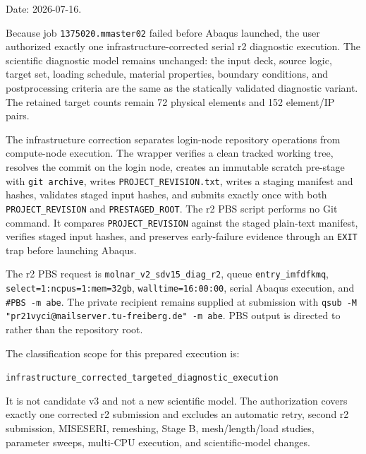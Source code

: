 \documentclass[11pt,a4paper]{article}
\begin{document}
Date: 2026-07-16.

Because job \texttt{1375020.mmaster02} failed before Abaqus launched, the user authorized exactly one infrastructure-corrected serial r2 diagnostic execution. The scientific diagnostic model remains unchanged: the input deck, source logic, target set, loading schedule, material properties, boundary conditions, and postprocessing criteria are the same as the statically validated diagnostic variant. The retained target counts remain 72 physical elements and 152 element/IP pairs.

The infrastructure correction separates login-node repository operations from compute-node execution. The wrapper  verifies a clean tracked working tree, resolves the commit on the login node, creates an immutable scratch pre-stage with \texttt{git archive}, writes \texttt{PROJECT\_REVISION.txt}, writes a staging manifest and hashes, validates staged input hashes, and submits exactly once with both \texttt{PROJECT\_REVISION} and \texttt{PRESTAGED\_ROOT}. The r2 PBS script  performs no Git command. It compares \texttt{PROJECT\_REVISION} against the staged plain-text manifest, verifies staged input hashes, and preserves early-failure evidence through an \texttt{EXIT} trap before launching Abaqus.

The r2 PBS request is \texttt{molnar\_v2\_sdv15\_diag\_r2}, queue \texttt{entry\_imfdfkmq}, \texttt{select=1:ncpus=1:mem=32gb}, \texttt{walltime=16:00:00}, serial Abaqus execution, and \texttt{\#PBS -m abe}. The private recipient remains supplied at submission with \texttt{qsub -M "pr21vyci@mailserver.tu-freiberg.de" -m abe}. PBS output is directed to  rather than the repository root.

The classification scope for this prepared execution is:

\begin{center}
\texttt{infrastructure\_corrected\_targeted\_diagnostic\_execution}
\end{center}

It is not candidate v3 and not a new scientific model. The authorization covers exactly one corrected r2 submission and excludes an automatic retry, second r2 submission, MISESERI, remeshing, Stage B, mesh/length/load studies, parameter sweeps, multi-CPU execution, and scientific-model changes.
\end{document}

